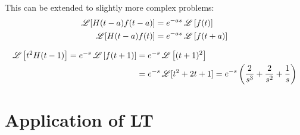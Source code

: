 This can be extended to slightly more complex problems:
\begin{align*}
\operatorname{\mathscr{L}}[H(t-a)f(t-a)]&=e^{-as}\operatorname{\mathscr{L}}\left[f(t)\right]\\
\operatorname{\mathscr{L}}[H(t-a)f(t)]&=e^{-as}\operatorname{\mathscr{L}}\left[f(t+a)\right]\\
\end{align*}

\begin{exmp}{}
\begin{align*}
\operatorname{\mathscr{L}}\left[t^2 H(t-1)\right]=e^{-s}\operatorname{\mathscr{L}}\left[f(t+1)\right]&=e^{-s}\operatorname{\mathscr{L}}\left[(t+1)^2\right]\\
&=e^{-s} \operatorname{\mathscr{L}}[t^2+2t+1]=e^{-s}\left(\frac{2}{s^3}+\frac{2}{s^2}+\frac{1}{s}\right)
\end{align*}
\end{exmp}

\section{Application of LT}
